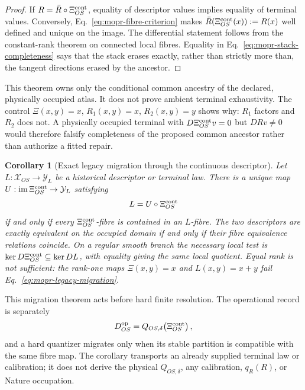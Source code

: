 \documentclass[11pt]{article}
\newtheorem{corollary}{Corollary}
\begin{document}
\begin{proof}
If \(R=\bar R\circ\Xi_{OS}^{\rm cont}\), equality of descriptor values implies equality
of terminal values.  Conversely, Eq.~\eqref{eq:mopr-fibre-criterion} makes
\(\bar R(\Xi_{OS}^{\rm cont}(x)):=R(x)\) well defined and unique on the image.  The
differential statement follows from the constant-rank theorem on connected
local fibres.  Equality in Eq.~\eqref{eq:mopr-stack-completeness} says that
the stack erases exactly, rather than strictly more than, the tangent
directions erased by the ancestor.
\end{proof}

This theorem owns only the conditional common ancestry of the declared,
physically occupied atlas.  It does not prove ambient terminal exhaustivity.
The control \(\Xi(x,y)=x\), \(R_1(x,y)=x\), \(R_2(x,y)=y\) shows why:
\(R_1\) factors and \(R_2\) does not.  A physically occupied terminal with
\(D\Xi_{OS}^{\rm cont}v=0\) but \(DRv\neq0\) would therefore falsify completeness of the
proposed common ancestor rather than authorize a fitted repair.

\begin{corollary}[Exact legacy migration through the continuous descriptor]
\label{cor:mopr-migration}
Let $L:\mathcal X_{OS}\to\mathcal Y_L$ be a historical descriptor or
terminal law.  There is a unique map
$U:\operatorname{im}\Xi_{OS}^{\rm cont}\to\mathcal Y_L$ satisfying
\begin{equation}
 L=U\circ\Xi_{OS}^{\rm cont}
 \label{eq:mopr-legacy-migration}
\end{equation}
if and only if every \(\Xi_{OS}^{\rm cont}\)-fibre is contained in an
$L$-fibre.  The two descriptors are exactly equivalent on the occupied
domain if and only if their fibre equivalence relations coincide.  On a
regular smooth branch the necessary local test is
$\ker D\Xi_{OS}^{\rm cont}\subseteq\ker DL$, with equality giving the same
local quotient.  Equal rank is not sufficient: the rank-one maps
$\Xi(x,y)=x$ and $L(x,y)=x+y$ fail Eq.~\eqref{eq:mopr-legacy-migration}.
\end{corollary}

This migration theorem acts before hard finite resolution.  The operational
record is separately
\begin{equation}
 D_{OS}^{\rm op}=Q_{OS,\delta}\!\left(\Xi_{OS}^{\rm cont}\right),
 \label{eq:mopr-operational-record}
\end{equation}
and a hard quantizer migrates only when its stable partition is compatible
with the same fibre map.  The corollary transports an already supplied
terminal law or calibration; it does not derive the physical
$Q_{OS,\delta}$, any calibration, $q_R(R)$, or Nature occupation.
\end{document}
